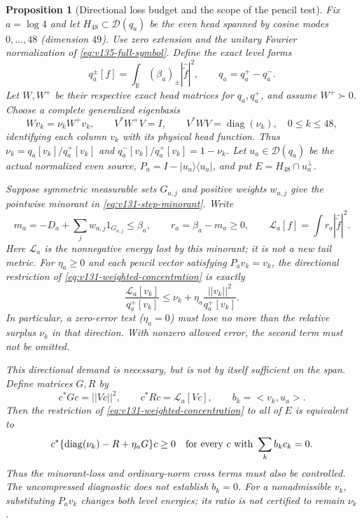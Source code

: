 \documentclass[11pt]{article}
\def\norm#1{||#1||}%
\def\ip#1#2{<#1,#2>}%
\newtheorem{proposition}[theorem]{Proposition}
\theoremstyle{remark}
\newcommand{\norm}[1]{\left\lVert #1\right\rVert}
\newcommand{\ip}[2]{\left\langle #1,#2\right\rangle}
\begin{document}
\begin{proposition}[Directional loss budget and the scope of the pencil test]
\label{prop:v144-pencil-concentration}
Fix $a=\log4$ and let $H_{48}\subset\mathcal D(q_a)$ be the even
head spanned by cosine modes $0,\ldots,48$ (dimension $49$).
Use zero extension and the unitary Fourier normalization of
\eqref{eq:v135-full-symbol}. Define the exact level forms
\[
 q_a^\pm[f]=\int_{\mathbb R}(\beta_a)_\pm
                    |\widehat{\widetilde f}|^2,
 \qquad q_a=q_a^+-q_a^-.
\]
Let $W,W^+$ be their respective exact head matrices for $q_a,q_a^+$,
and assume $W^+\succ0$. Choose a complete generalized eigenbasis
\[
 Wv_k=\nu_k W^+v_k,\qquad
 V^*W^+V=I,\qquad V^*WV=\operatorname{diag}(\nu_k),
 \quad 0\le k\le48,
\]
identifying each column $v_k$ with its physical head function.
Thus $\nu_k=q_a[v_k]/q_a^+[v_k]$ and
$q_a^-[v_k]/q_a^+[v_k]=1-\nu_k$.
Let $u_a\in\mathcal D(q_a)$ be the actual normalized even source,
$P_a=I-|u_a\rangle\langle u_a|$, and put
$E=H_{48}\cap u_a^\perp$.

Suppose symmetric measurable sets $G_{a,j}$ and positive weights $w_{a,j}$
give the pointwise minorant in \eqref{eq:v131-step-minorant}. Write
\[
 m_a=-D_a+\sum_jw_{a,j}1_{G_{a,j}}\le\beta_a,\qquad
 r_a=\beta_a-m_a\ge0,\qquad
 \mathcal L_a[f]=\int r_a|\widehat{\widetilde f}|^2.
\]
Here $\mathcal L_a$ is the nonnegative energy lost by this minorant;
it is not a new tail metric. For $\eta_a\ge0$ and each pencil
vector satisfying $P_av_k=v_k$, the directional restriction of
\eqref{eq:v131-weighted-concentration} is exactly
\begin{equation}\label{eq:v144-direction-budget}
 \frac{\mathcal L_a[v_k]}{q_a^+[v_k]}
 \le\nu_k+\eta_a\frac{\norm{v_k}^2}{q_a^+[v_k]}.
\end{equation}
In particular, a zero-error test ($\eta_a=0$) must lose no more
than the relative surplus $\nu_k$ in that direction. With nonzero
allowed error, the second term must not be omitted.

This directional demand is necessary, but is not by itself sufficient
on the span. Define matrices $G,R$ by
\[
 c^*Gc=\norm{Vc}^2,\qquad c^*Rc=\mathcal L_a[Vc],
 \qquad b_k=\ip{v_k}{u_a}.
\]
Then the restriction of \eqref{eq:v131-weighted-concentration} to
\emph{all} of $E$ is equivalent to
\begin{equation}\label{eq:v144-pencil-matrix}
 c^*\{\operatorname{diag}(\nu_k)-R+\eta_a G\}c\ge0
 \quad\hbox{for every }c\hbox{ with }\sum_k b_kc_k=0.
\end{equation}
Thus the minorant-loss and ordinary-norm cross terms must also be
controlled. The uncompressed diagnostic does not establish $b_k=0$.
For a nonadmissible $v_k$, substituting $P_av_k$ changes both level
energies; its ratio is not certified to remain $\nu_k$.


\end{proposition}
\end{document}
